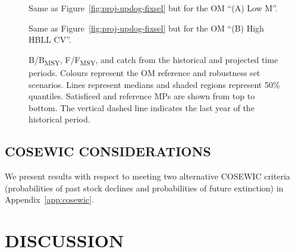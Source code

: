 \documentclass[11pt]{book}
\begin{document}
\begin{figure}[htb]

{\centering {} 

}

\caption{Same as Figure~\ref{fig:proj-updog-fixsel} but for the OM ``(A) Low M''.}\label{fig:proj-low-m}
\end{figure}

\begin{figure}[htb]

{\centering {} 

}

\caption{Same as Figure~\ref{fig:proj-updog-fixsel} but for the OM ``(B) High HBLL CV''.}\label{fig:proj-high-index-cv}
\end{figure}

\begin{figure}[htb]

{\centering {} 

}

\caption{B/B\textsubscript{MSY}, F/F\textsubscript{MSY}, and catch from the historical and projected time periods. Colours represent the OM reference and robustness set scenarios. Lines represent medians and shaded regions represent 50\% quantiles. Satisficed and reference MPs are shown from top to bottom. The vertical dashed line indicates the last year of the historical period.}\label{fig:proj-scenarios}
\end{figure}
\clearpage

\hypertarget{cosewic-considerations}{%
\subsection{COSEWIC CONSIDERATIONS}\label{cosewic-considerations}}

We present results with respect to meeting two alternative COSEWIC criteria (probabilities of past stock declines and probabilities of future extinction) in Appendix~\ref{app:cosewic}.

\hypertarget{sec:discussion}{%
\section{DISCUSSION}\label{sec:discussion}}
\end{document}
